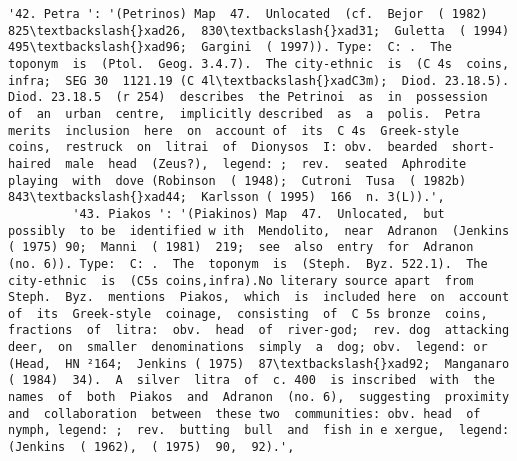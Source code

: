 \documentclass[11pt]{article}
\begin{document}
\begin{Verbatim}[commandchars=\\\{\}]
         '42. Petra ': '(Petrinos) Map  47.  Unlocated  (cf.  Bejor  ( 1982) 825\textbackslash{}xad26,  830\textbackslash{}xad31;  Guletta  ( 1994)  495\textbackslash{}xad96;  Gargini  ( 1997)). Type:  C: .  The  toponym  is  (Ptol.  Geog. 3.4.7).  The city-ethnic  is  (C 4s  coins,  infra;  SEG 30  1121.19 (C 4l\textbackslash{}xadC3m);  Diod. 23.18.5).  Diod. 23.18.5  (r 254)  describes  the Petrinoi  as  in  possession  of  an  urban  centre,  implicitly described  as  a  polis.  Petra merits  inclusion  here  on  account of  its  C 4s  Greek-style  coins,  restruck  on  litrai  of  Dionysos  I: obv.  bearded  short-haired  male  head  (Zeus?),  legend: ;  rev.  seated  Aphrodite  playing  with  dove (Robinson  ( 1948);  Cutroni  Tusa  ( 1982b)  843\textbackslash{}xad44;  Karlsson ( 1995)  166  n. 3(L)).',
         '43. Piakos ': '(Piakinos) Map  47.  Unlocated,  but  possibly  to be  identified w ith  Mendolito,  near  Adranon  (Jenkins  ( 1975) 90;  Manni  ( 1981)  219;  see  also  entry  for  Adranon  (no. 6)). Type:  C: .  The  toponym  is  (Steph.  Byz. 522.1).  The city-ethnic  is  (C5s coins,infra).No literary source apart  from  Steph.  Byz.  mentions  Piakos,  which  is  included here  on  account  of  its  Greek-style  coinage,  consisting  of  C 5s bronze  coins,  fractions  of  litra:  obv.  head  of  river-god;  rev. dog  attacking  deer,  on  smaller  denominations  simply  a  dog; obv.  legend: or (Head,  HN ²164;  Jenkins ( 1975)  87\textbackslash{}xad92;  Manganaro  ( 1984)  34).  A  silver  litra  of  c. 400  is inscribed  with  the  names  of  both  Piakos  and  Adranon  (no. 6),  suggesting  proximity  and  collaboration  between  these two  communities: obv. head  of nymph, legend: ;  rev.  butting  bull  and  fish in e xergue,  legend: (Jenkins  ( 1962),  ( 1975)  90,  92).',

\end{Verbatim}
\end{document}
